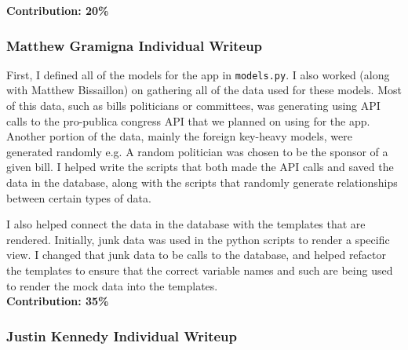 \documentclass{article}
\newcommand{\n}{\noindent}
\begin{document}
\n\textbf{Contribution: 20\%}
\pagebreak

\subsubsection*{Matthew Gramigna Individual Writeup}

First, I defined all of the models for the app in \verb|models.py|. I also worked (along with Matthew Bissaillon) on gathering all of the data used for these models. Most of this data, such as bills politicians or committees, was generating using API calls to the pro-publica congress API that we planned on using for the app.  Another portion of the data, mainly the foreign key-heavy models, were generated randomly e.g. A random politician was chosen to be the sponsor of a given bill. I helped write the scripts that both made the API calls and saved the data in the database, along with the scripts that randomly generate relationships between certain types of data.

I also helped connect the data in the database with the templates that are rendered. Initially, junk data was used in the python scripts to render a specific view. I changed that junk data to be calls to the database, and helped refactor the templates to ensure that the correct variable names and such are being used to render the mock data into the templates. \\

\n\textbf{Contribution: 35\%} 

\pagebreak

\subsubsection*{Justin Kennedy Individual Writeup}
\end{document}
